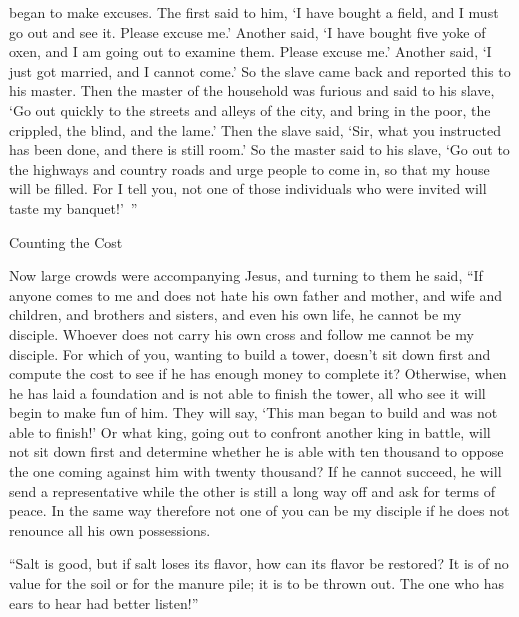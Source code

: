 {began
to make excuses.
The first
said
to him,
‘I have bought
a field,
and
I must
go out
and see
it.
Please
excuse
me.’
Another
said,
‘I have bought
five
yoke
of oxen,
and
I am going out
to examine
them.
Please
excuse
me.’
Another
said,
‘I
just got married,
and
I cannot
come.’
So
the slave
came back
and reported
this to
his
master.
Then
the master of the household
was furious
and said
to
his
slave,
‘Go out
quickly
to
the streets
and
alleys
of the city,
and
bring in
the
poor,
the crippled,
the blind,
and
the lame.’
Then
the slave
said,
‘Sir,
what you instructed
has been done,
and
there is
still
room.’
So
the master
said
to
his slave,
‘Go out
to
the highways
and
country roads
and
urge
people to come in,
so that
my
house
will be filled.
For
I tell
you,
not one
of those
individuals
who were invited
will taste
my
banquet!’ ”
\par }{\SH Counting the Cost
\par }{\PP {}Now large
crowds
were accompanying
Jesus,
and
turning
to
them
he said,
“If
anyone
comes
to
me
and
does
not
hate
his own
father
and
mother,
and
wife
and
children,
and
brothers
and
sisters,
and
even
his own
life,
he cannot
be
my
disciple.
Whoever
does
not
carry
his own
cross
and
follow
me
cannot
be
my
disciple.
For
which
of
you,
wanting
to build
a tower,
doesn’t
sit down
first
and compute
the cost
to see if
he has
enough money to
complete it?
Otherwise,
when
he
has laid
a foundation
and
is
not
able
to finish
the tower, all
who see
it will begin
to make fun
of him.
They will say, ‘This
man
began
to build
and
was
not
able
to finish!’
Or
what
king,
going out
to confront
another
king
in
battle,
will
not
sit down
first
and determine
whether
he is
able
with
ten
thousand
to oppose
the one coming
against
him
with
twenty
thousand?
If
he cannot
succeed, he will send
a representative
while the other is still
a long way off
and ask for
terms of
peace.
In the same way
therefore
not
one of
you
can
be
my
disciple
if he does
not
renounce
all
his own
possessions.
\par }{\PP {}“Salt
is good,
but
if
salt
loses
its flavor,
how can
its flavor be restored?
It is of no
value
for
the soil
or
for
the manure pile;
it is
to be thrown
out.
The one who has
ears
to hear
had better listen!”

}
